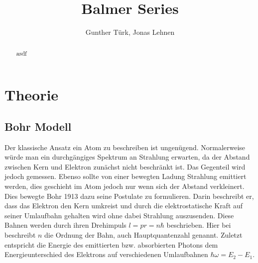 \documentclass[]{article}
\title{Balmer Series}
\author{Gunther T\"urk, Jonas Lehnen}
\begin{document}
\maketitle
\begin{abstract}
asdf

\end{abstract}

\tableofcontents

\newpage
\section{Theorie}
\subsection{Bohr Modell}
Der klassische Ansatz ein Atom zu beschreiben ist ungenügend. Normalerweise würde man ein durchgängiges Spektrum an Strahlung erwarten, da der Abstand zwischen Kern und Elektron zunächst nicht beschränkt ist. Das Gegenteil wird jedoch gemessen. Ebenso sollte von einer bewegten Ladung Strahlung emittiert werden, dies geschieht im Atom jedoch nur wenn sich der Abstand verkleinert. Dies bewegte Bohr 1913 dazu seine Postulate zu formulieren. Darin beschreibt er, dass das Elektron den Kern umkreist und durch die elektrostatische Kraft auf seiner Umlaufbahn gehalten wird ohne dabei Strahlung auszusenden. Diese Bahnen werden durch ihren Drehimpuls $l = pr = n\hbar$ beschrieben. Hier bei beschreibt $n$ die Ordnung der Bahn, auch Hauptquantenzahl genannt. Zuletzt entspricht die Energie des emittierten bzw. absorbierten Photons dem Energieunterschied des Elektrons auf verschiedenen Umlaufbahnen $ \hbar \omega = E_2 - E_1$. 
\end{document}
